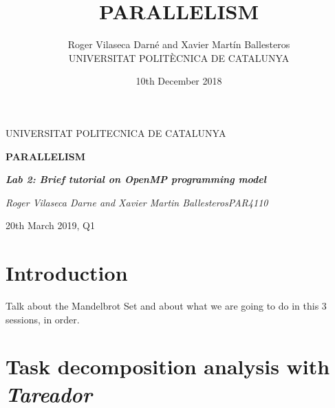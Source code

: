 \documentclass[12pt, a4paper]{article}
\title{PARALLELISM}
\author{Roger Vilaseca Darné and Xavier Martín Ballesteros\\
  \small UNIVERSITAT POLITÈCNICA DE CATALUNYA\\
}
\date{10th December 2018}
\begin{document}
\graphicspath{ {./images} }


\begin{titlepage}
	\centering
	\vspace{1cm}
	{\scshape\Large UNIVERSITAT POLITECNICA DE CATALUNYA\par}
	\vspace{1.5cm}
	{\huge\bfseries PARALLELISM\par}
	\vspace{2cm}
	{\Large\itshape \textbf{Lab 2: Brief tutorial on OpenMP programming model}\par}
	\vfill
	{\Large\itshape Roger Vilaseca Darne and Xavier Martin Ballesteros\break PAR4110\par}
	\vfill

	\vfill

	{\large 20th March 2019, Q1}
\end{titlepage}


\setcounter{secnumdepth}{5}

\newpage
  \tableofcontents
\newpage


\section{Introduction}

Talk about the Mandelbrot Set and about what we are going to do in this 3 sessions, in order.

\section{Task decomposition analysis with \textit{Tareador}}
\label{sec:tareador}
\end{document}
